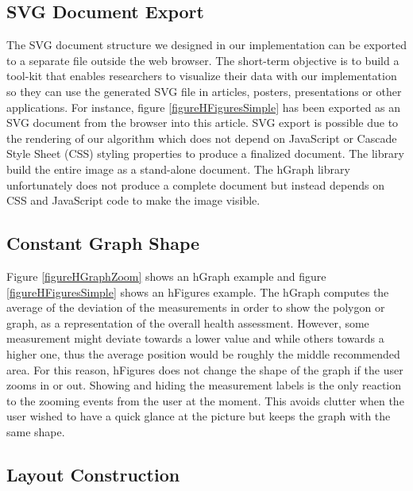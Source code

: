 \documentclass[twocolumn]{bmcart}%
\begin{document}
\subsection*{SVG Document Export}

The SVG document structure we designed in our implementation can be exported to a separate file outside the web browser. The short-term objective is to build a tool-kit that enables researchers to visualize their data with our implementation so they can use the generated SVG file in articles, posters, presentations or other applications. For instance, figure \ref{figureHFiguresSimple} has been exported as an SVG document from the browser into this article. SVG export is possible due to the rendering of our algorithm which does not depend on JavaScript or Cascade Style Sheet (CSS) styling properties to produce a finalized document. The library build the entire image as a stand-alone document. The hGraph library unfortunately does not produce a complete document but instead depends on CSS and JavaScript code to make the image visible.

\subsection*{Constant Graph Shape}

Figure \ref{figureHGraphZoom} shows an hGraph example and figure \ref{figureHFiguresSimple} shows an hFigures example. The hGraph computes the average of the deviation of the measurements in order to show the polygon or graph, as a representation of the overall health assessment. However, some measurement might deviate towards a lower value and while others towards a higher one, thus the average position would be roughly the middle recommended area. For this reason, hFigures does not change the shape of the graph if the user zooms in or out. Showing and hiding the measurement labels is the only reaction to the zooming events from the user at the moment. This avoids clutter when the user wished to have a quick glance at the picture but keeps the graph with the same shape.

\subsection*{Layout Construction}
\end{document}
